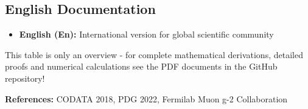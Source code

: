 \documentclass[12pt,a4paper]{article}
\begin{document}
	\subsection{English Documentation}
	
	\begin{itemize}
		\item \textbf{English (En):} International version for global scientific community
	\end{itemize}
	

	This table is only an overview - for complete mathematical derivations, detailed proofs and numerical calculations see the PDF documents in the GitHub repository!
	
	\textbf{References:} CODATA 2018, PDG 2022, Fermilab Muon g-2 Collaboration
	
\end{document}
